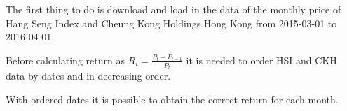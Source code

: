 The first thing to do is download and load in the data of the monthly
price of Hang Seng Index and Cheung Kong Holdings Hong Kong from
2015-03-01 to 2016-04-01.

\begin{Shaded}
\begin{Highlighting}[]

\StringTok{ }\NormalTok{(}\NormalTok{, }\NormalTok{, }
\StringTok{           }\NormalTok{,}\NormalTok{, } \NormalTok{, }
\StringTok{           }\NormalTok{)}

\StringTok{ }\NormalTok{(}\NormalTok{, }\NormalTok{, }
\StringTok{           }\NormalTok{, }\NormalTok{, } \NormalTok{, }
\StringTok{           }\NormalTok{)}

\NormalTok{); }\NormalTok{)}
\end{Highlighting}
\end{Shaded}

Before calculating return as
\(R_i = \displaystyle \frac{P_t - P_{t-1}}{P_t}\) it is needed to order
HSI and CKH data by dates and in decreasing order.

\begin{Shaded}
\begin{Highlighting}[]
\StringTok{ }\NormalTok{(}\NormalTok{)}
\NormalTok{(hsi.df)[}\NormalTok{] <-}
\StringTok{ }\NormalTok{hsi.df[}\NormalTok{(}\NormalTok{(hsi.df$Date)),]}
\end{Highlighting}
\end{Shaded}

With ordered dates it is possible to obtain the correct return for each
month.

